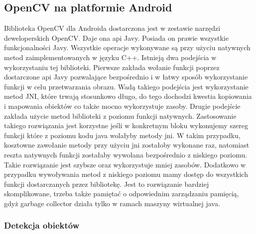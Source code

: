 \subsection{OpenCV na platformie Android}

Biblioteka OpenCV dla Androida dostarczona jest w zestawie narzędzi deweloperskich OpenCV. Daje ona api Javy. Posiada on prawie wszystkie funkcjonalności Javy. Wszystkie operacje wykonywane są przy użyciu natywnych metod zaimplementowanych w języku C++. Istnieją dwa podejścia w wykorzystaniu tej biblioteki. Pierwsze zakłada wołanie funkcji poprzez dostarczone api Javy pozwalające bezpośrednio i w łatwy sposób wykorzystanie funkcji w celu przetwarzania obrazu. Wadą takiego podejścia jest wykorzystanie metod JNI, które trwają stosunkowo długo, do tego dochodzi kwestia kopiowania i mapowania obiektów co także mocno wykorzystuje zasoby. Drugie podejście zakłada użycie metod biblioteki z poziomu funkcji natywnych. Zastosowanie takiego rozwiązania jest korzystne jeśli w konkretnym bloku wykonujemy szereg funkcji które z poziomu kodu java wolałyby metody jni. W takim przypadku, kosztowne zawołanie metody przy użyciu jni zostałoby wykonane raz, natomiast reszta natywnych funkcji zostałaby wywołana bezpośrednio z niskiego poziomu. Takie rozwiązanie jest szybsze oraz wykorzystuje mniej zasobów. Dodatkowo w przypadku wywoływania metod z niskiego poziomu mamy dostęp do wszystkich funkcji dostarczanych przez bibliotekę. Jest to rozwiązanie bardziej skomplikowane, trzeba także pamiętać o odpowiednim zarządzaniu pamięcią, gdyż garbage collector działa tylko w ramach maszyny wirtualnej java.

\subsubsection{Detekcja obiektów}

